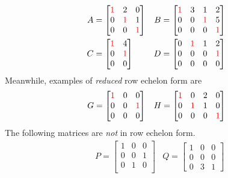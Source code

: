\begin{align*}
A &=
\begin{bmatrix}
\textcolor{red}{1} & 2 & 0 \\
0 & \textcolor{red}{1} & 1 \\
0 & 0 & \textcolor{red}{1}
\end{bmatrix}
& B &=
\begin{bmatrix}
\textcolor{red}{1} & 3 & 1 & 2 \\
0 & 0 & \textcolor{red}{1} & 5 \\
0 & 0 & 0 & \textcolor{red}{1}
\end{bmatrix} \\
C &=
\begin{bmatrix}
\textcolor{red}{1} & 4 \\
0 & \textcolor{red}{1} \\
0 & 0 
\end{bmatrix}
& D &=
\begin{bmatrix}
0 & \textcolor{red}{1} & 1 & 2 \\
0 & 0 & 0 & \textcolor{red}{1} \\
0 & 0 & 0 & 0
\end{bmatrix}
\end{align*}
Meanwhile, examples of \textit{reduced} row echelon form are
\begin{align*}
& G =
\begin{bmatrix}
\textcolor{red}{1} & 0 & 0 \\
0 & 0 & \textcolor{red}{1}\\
0 & 0 & 0 
\end{bmatrix}
& H =
\begin{bmatrix}
\textcolor{red}{1} & 0 & 2 & 0 \\
0 & \textcolor{red}{1} & 1 & 0 \\
0 & 0 & 0 & \textcolor{red}{1}
\end{bmatrix}
\end{align*}
The following matrices are \textit{not} in row echelon form.
\begin{align*}
& P =
\begin{bmatrix}
1 & 0 & 0 \\
0 & 0 & 1 \\
0 & 1 & 0 \\
\end{bmatrix}
& Q =
\begin{bmatrix}
1 & 0 & 0 \\
0 & 0 & 0 \\
0 & 3 & 1
\end{bmatrix}
\end{align*}
